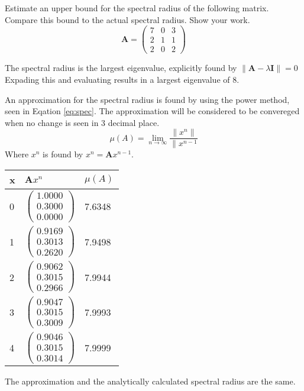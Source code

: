 Estimate an upper bound for the spectral radius of the following matrix. Compare this bound to the actual spectral radius. Show your work.
\begin{equation*}
	\boldsymbol{A}=
		\begin{pmatrix}
			7&0&3\\2&1&1\\2&0&2
		\end{pmatrix}
\end{equation*}

The spectral radius is the largest eigenvalue, explicitly found by $\|\boldsymbol{A}-\lambda \boldsymbol{I}\|=0$
Expading this and evaluating results in a largest eigenvalue of $8$.

An approximation for the spectral radius is found by using the power method, seen in Eqation \ref{eq:spec}. The approximation will be considered to be convereged when no change is seen in 3 decimal place.
\begin{equation}
	\mu\left(A\right)=\lim_{n \to \infty} \frac{\|x^n\|}{\|x^{n-1}}
	\label{eq:spec}
\end{equation}
Where $x^n$ is found by $x^n=\boldsymbol{A}x^{n-1}$.

\begin{longtable}{lll}
x & $\boldsymbol{A}x^n$ & $\mu\left(A\right)$ \\
\endfirsthead
%
\endhead
0 & $\begin{pmatrix} 1.0000\\0.3000\\0.0000\end{pmatrix}$ & 7.6348\\1 & $\begin{pmatrix} 0.9169\\0.3013\\0.2620\end{pmatrix}$ & 7.9498\\2 & $\begin{pmatrix} 0.9062\\0.3015\\0.2966\end{pmatrix}$ & 7.9944\\3 & $\begin{pmatrix} 0.9047\\0.3015\\0.3009\end{pmatrix}$ & 7.9993\\4 & $\begin{pmatrix} 0.9046\\0.3015\\0.3014\end{pmatrix}$ & 7.9999\\
\end{longtable}

The approximation and the analytically calculated spectral radius are the same.